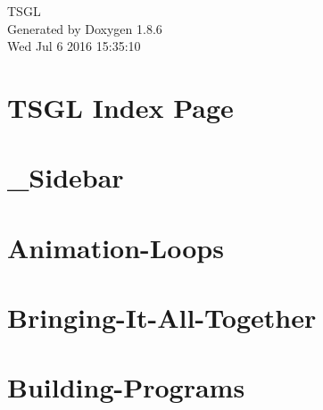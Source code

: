 \documentclass[twoside]{book}
\newcommand{\clearemptydoublepage}{%
  \newpage{\pagestyle{empty}\cleardoublepage}%
}
\begin{document}
\hypersetup{pageanchor=false}
\begin{titlepage}
\vspace*{7cm}
\begin{center}%
{\Large T\-S\-G\-L }\\
\vspace*{1cm}
{\large Generated by Doxygen 1.8.6}\\
\vspace*{0.5cm}
{\small Wed Jul 6 2016 15:35:10}\\
\end{center}
\end{titlepage}
\clearemptydoublepage
\tableofcontents
\clearemptydoublepage
{}
\hypersetup{pageanchor=true}

\chapter{T\-S\-G\-L Index Page}
\label{index}\hypertarget{index}{}
\chapter{\-\_\-\-Sidebar}
\label{md__home_kodemonkey_workspace__t_s_g_l_docs-wiki___sidebar}
\hypertarget{md__home_kodemonkey_workspace__t_s_g_l_docs-wiki___sidebar}{}

\chapter{Animation-\/\-Loops}
\label{md__home_kodemonkey_workspace__t_s_g_l_docs-wiki__animation-_loops}
\hypertarget{md__home_kodemonkey_workspace__t_s_g_l_docs-wiki__animation-_loops}{}

\chapter{Bringing-\/\-It-\/\-All-\/\-Together}
\label{md__home_kodemonkey_workspace__t_s_g_l_docs-wiki__bringing-_it-_all-_together}
\hypertarget{md__home_kodemonkey_workspace__t_s_g_l_docs-wiki__bringing-_it-_all-_together}{}

\chapter{Building-\/\-Programs}
\label{md__home_kodemonkey_workspace__t_s_g_l_docs-wiki__building-_programs}
\hypertarget{md__home_kodemonkey_workspace__t_s_g_l_docs-wiki__building-_programs}{}

\end{document}
